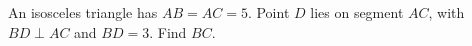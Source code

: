 An isosceles triangle has $AB=AC=5$. Point $D$ lies on segment $AC$, with $BD\perp AC$ and $BD=3$. Find $BC$.
